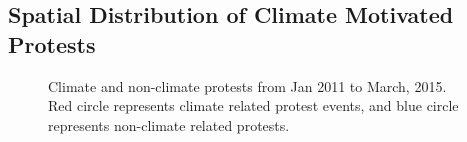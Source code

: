 \documentclass[9pt,twocolumn,twoside]{pnas-new}
\begin{document}

\subsection{Spatial Distribution of Climate Motivated Protests}
\begin{figure}[ht]
	\centering
	\caption{Climate and non-climate protests from Jan 2011 to March, 2015. Red circle represents climate related protest events, and blue circle represents non-climate related protests. }
\label{climate-map}
\end{figure}
\end{document}
